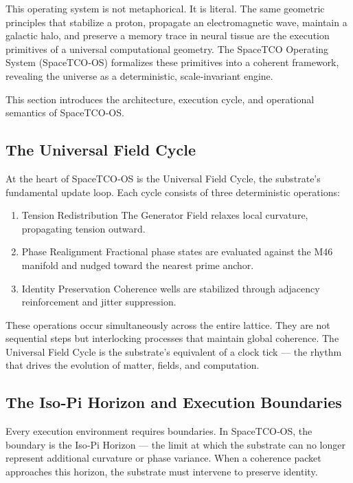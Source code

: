 \documentclass[reprint,amsmath,amssymb,aps,prl,floatfix]{revtex4-2}
\begin{document}
\begin{itemize}
This operating system is not metaphorical. It is literal. The same geometric principles that stabilize a proton, propagate an electromagnetic wave, maintain a galactic halo, and preserve a memory trace in neural tissue are the execution primitives of a universal computational geometry. The SpaceTCO Operating System (SpaceTCO‑OS) formalizes these primitives into a coherent framework, revealing the universe as a deterministic, scale‑invariant engine.
\medskip

This section introduces the architecture, execution cycle, and operational semantics of SpaceTCO‑OS.

\subsection{The Universal Field Cycle}

At the heart of SpaceTCO‑OS is the Universal Field Cycle, the substrate’s fundamental update loop. Each cycle consists of three deterministic operations:
\begin{enumerate}
\item Tension Redistribution  
   The Generator Field relaxes local curvature, propagating tension outward.

\item Phase Realignment  
   Fractional phase states are evaluated against the M46 manifold and nudged toward the nearest prime anchor.

\item Identity Preservation  
   Coherence wells are stabilized through adjacency reinforcement and jitter suppression.

\end{enumerate}

These operations occur simultaneously across the entire lattice. They are not sequential steps but interlocking processes that maintain global coherence. The Universal Field Cycle is the substrate’s equivalent of a clock tick — the rhythm that drives the evolution of matter, fields, and computation.

\subsection{The Iso‑Pi Horizon and Execution Boundaries}

Every execution environment requires boundaries. In SpaceTCO‑OS, the boundary is the Iso‑Pi Horizon — the limit at which the substrate can no longer represent additional curvature or phase variance. When a coherence packet approaches this horizon, the substrate must intervene to preserve identity.
\medskip


\end{itemize}
\end{document}
